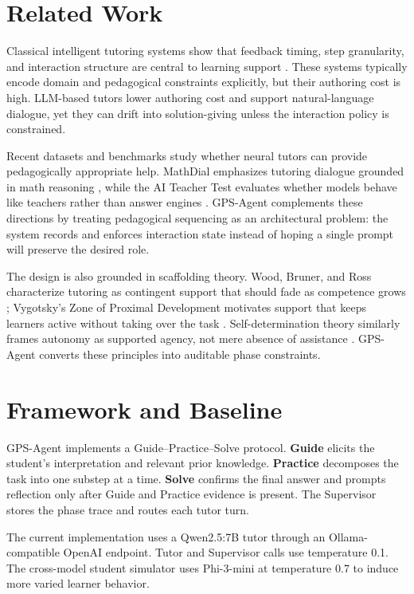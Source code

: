 \documentclass[11pt]{article}
\begin{document}
\section{Related Work}
Classical intelligent tutoring systems show that feedback timing, step granularity, and interaction structure are central to learning support \citep{koedinger2006cognitive,vanlehn2011relative}. These systems typically encode domain and pedagogical constraints explicitly, but their authoring cost is high. LLM-based tutors lower authoring cost and support natural-language dialogue, yet they can drift into solution-giving unless the interaction policy is constrained.

Recent datasets and benchmarks study whether neural tutors can provide pedagogically appropriate help. MathDial emphasizes tutoring dialogue grounded in math reasoning \citep{macina2023mathdial}, while the AI Teacher Test evaluates whether models behave like teachers rather than answer engines \citep{tack2022teacher}. GPS-Agent complements these directions by treating pedagogical sequencing as an architectural problem: the system records and enforces interaction state instead of hoping a single prompt will preserve the desired role.

The design is also grounded in scaffolding theory. Wood, Bruner, and Ross characterize tutoring as contingent support that should fade as competence grows \citep{wood1976role}; Vygotsky's Zone of Proximal Development motivates support that keeps learners active without taking over the task \citep{vygotsky1978mind}. Self-determination theory similarly frames autonomy as supported agency, not mere absence of assistance \citep{ryan2000sdt}. GPS-Agent converts these principles into auditable phase constraints.

\section{Framework and Baseline}
GPS-Agent implements a Guide--Practice--Solve protocol. \textbf{Guide} elicits the student's interpretation and relevant prior knowledge. \textbf{Practice} decomposes the task into one substep at a time. \textbf{Solve} confirms the final answer and prompts reflection only after Guide and Practice evidence is present. The Supervisor stores the phase trace and routes each tutor turn.

The current implementation uses a Qwen2.5:7B tutor through an Ollama-compatible OpenAI endpoint. Tutor and Supervisor calls use temperature 0.1. The cross-model student simulator uses Phi-3-mini at temperature 0.7 to induce more varied learner behavior.
\end{document}
